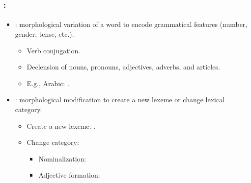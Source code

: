 \documentclass[xcolor=table]{beamer}
\begin{document}
\begin{frame}
	\frametitle{\insertshortsubtitle: \insertsection}
	\framesubtitle{\insertsubsection}
	
	\begin{itemize}
		\item {} : morphological variation of a word to encode grammatical features (number, gender, tense, etc.).
		\begin{itemize}
			\item Verb conjugation.
			\item Declension of nouns, pronouns, adjectives, adverbs, and articles. 
			\item E.g., Arabic: .
		\end{itemize}
		
		\item {}: morphological modification to create a new lexeme or change lexical category.
		\begin{itemize}
			\item Create a new lexeme: .
			\item Change category: 
			\begin{itemize}
				\item Nominalization: 
				\item Adjective formation: 
			\end{itemize}
		\end{itemize}
	\end{itemize}

\end{frame}
\end{document}
